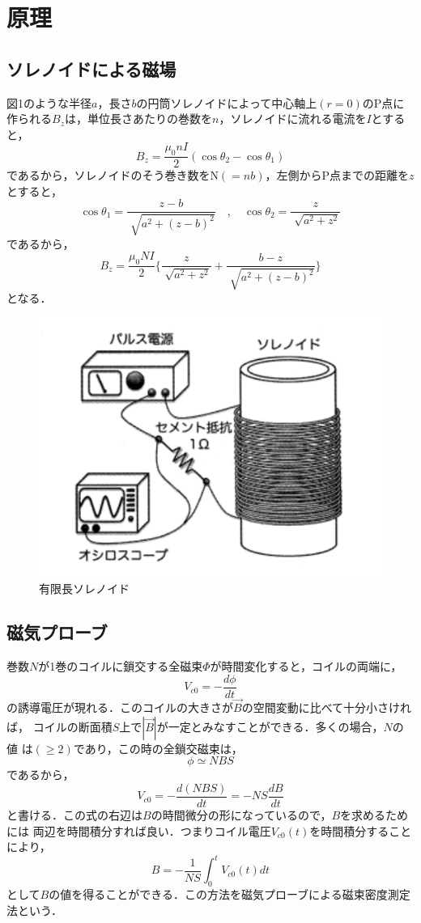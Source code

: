 
\section{原理}

\subsection{ソレノイドによる磁場}
図1のような半径$a$，長さ$b$の円筒ソレノイドによって中心軸上$(r = 0)$のP点に
作られる$B_z$は，単位長さあたりの巻数を$n$，ソレノイドに流れる電流を$I$とすると，
$$
B_z=\frac{\mu_0 n I}{2}(\cos \theta_2 - \cos \theta_1)
$$
であるから，ソレノイドのそう巻き数をN$(=nb)$，左側からP点までの距離を$z$とすると，
$$
\cos \theta_1 = \frac{z-b}{\sqrt[]{a^2+(z-b)^2}}\quad,\quad \cos \theta_2 = \frac{z}{\sqrt[]{a^2+z^2}}
$$
であるから，
$$
B_z=\frac{\mu_0 NI}{2} \{ \frac{z}{\sqrt[]{a^2+z^2}} + \frac{b-z}{\sqrt[]{a^2+(z-b)^2}} \}
$$
となる．
\begin{figure}[!ht]
    \centering
    \includegraphics[scale=1]{figure1.pdf}
    \caption{有限長ソレノイド}
\end{figure}

\newpage

\subsection{磁気プローブ}
巻数$N$が1巻のコイルに鎖交する全磁束$\Phi$が時間変化すると，コイルの両端に，
$$
V_{c0}=-\frac{d\phi}{dt}
$$
の誘導電圧が現れる．このコイルの大きさが$\vec{B}$の空間変動に比べて十分小さければ，
コイルの断面積$S$上で$|\vec{B}|$が一定とみなすことができる．多くの場合，$N$の値
は$(\geq2)$であり，この時の全鎖交磁束は，
$$
\phi \simeq NBS
$$
であるから，
$$
V_{c0}=- \frac{d(NBS)}{dt}=-NS\frac{dB}{dt}
$$
と書ける．この式の右辺は$B$の時間微分の形になっているので，$B$を求めるためには
両辺を時間積分すれば良い．つまりコイル電圧$V_{c0}(t)$を時間積分することにより，
$$
B=-\frac{1}{NS} \int_{0}^{t} V_{c0}(t)dt
$$
として$B$の値を得ることができる．この方法を磁気プローブによる磁束密度測定法という．

